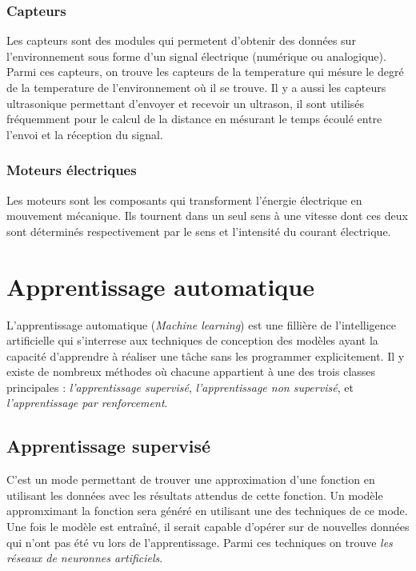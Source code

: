 \subsubsection{Capteurs}
Les capteurs sont des modules qui permetent d'obtenir des données sur
l'environnement sous forme d'un signal électrique (numérique ou analogique).
Parmi ces capteurs, on trouve les capteurs de la temperature qui mésure le degré
de la temperature de l'environnement où il se trouve. Il y a aussi les capteurs
ultrasonique permettant d'envoyer et recevoir un ultrason, il sont utilisés
fréquemment pour le calcul de la distance en mésurant le temps écoulé entre
l'envoi et la réception du signal.

\subsubsection{Moteurs électriques}
Les moteurs sont les composants qui transforment l'énergie électrique en
mouvement mécanique. Ils tournent dans un seul sens à une vitesse dont ces deux
sont déterminés respectivement par le sens et l'intensité du courant électrique.

\section{Apprentissage automatique}

L'apprentissage automatique (\emph{Machine learning}) est une fillière de
l'intelligence artificielle qui s'interrese aux techniques de conception des
modèles ayant la capacité d'apprendre à réaliser une tâche sans les programmer
explicitement. Il y existe de nombreux méthodes où chacune appartient à
une des trois classes principales :
\emph{l'apprentissage supervisé}, \emph{l'apprentissage non supervisé}, et
\emph{l'apprentissage par renforcement}.

\subsection{Apprentissage supervisé}

C'est un mode permettant de trouver une approximation d'une fonction en utilisant
les données avec les résultats attendus de cette fonction. Un modèle appromximant
la fonction sera généré en utilisant une des techniques de ce mode. Une fois le
modèle est entraîné, il serait capable d'opérer sur de nouvelles données qui
n'ont pas été vu lors de l'apprentissage. Parmi ces techniques on trouve
\emph{les réseaux de neuronnes artificiels}.

